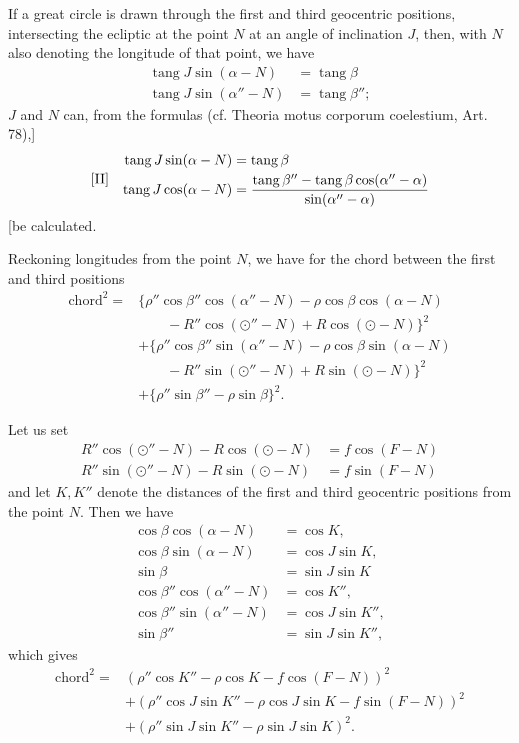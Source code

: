 If a great circle is drawn through the first and third geocentric positions, intersecting the ecliptic at the point \(N\) at an angle of inclination \(J\), then, with \(N\) also denoting the longitude of that point, we have
\[
\begin{aligned}
\operatorname{tang}J\sin(\alpha-N)&=\operatorname{tang}\beta\\
\operatorname{tang}J\sin(\alpha''-N)&=\operatorname{tang}\beta'';
\end{aligned}
\]
\(J\) and \(N\) can, from the formulas (cf. Theoria motus corporum coelestium, Art. 78),]
\[
\begin{array}{l@{\quad}l}
[\mathrm{II}]&\begin{aligned}
\operatorname{tang}J\sin(\alpha-N)&=\operatorname{tang}\beta\\
\operatorname{tang}J\cos(\alpha-N)&=\frac{\operatorname{tang}\beta''-\operatorname{tang}\beta\cos(\alpha''-\alpha)}{\sin(\alpha''-\alpha)}
\end{aligned}
\end{array}
\]
[be calculated.

Reckoning longitudes from the point \(N\), we have for the chord between the first and third positions
\[
\begin{aligned}
\text{chord}^2={}&\bigl\{\rho''\cos\beta''\cos(\alpha''-N)-\rho\cos\beta\cos(\alpha-N)\\
&\qquad{}-R''\cos(\odot''-N)+R\cos(\odot-N)\bigr\}^2\\
&+\bigl\{\rho''\cos\beta''\sin(\alpha''-N)-\rho\cos\beta\sin(\alpha-N)\\
&\qquad{}-R''\sin(\odot''-N)+R\sin(\odot-N)\bigr\}^2\\
&+\{\rho''\sin\beta''-\rho\sin\beta\}^2.
\end{aligned}
\]

Let us set
\[
\begin{aligned}
R''\cos(\odot''-N)-R\cos(\odot-N)&=f\cos(F-N)\\
R''\sin(\odot''-N)-R\sin(\odot-N)&=f\sin(F-N)
\end{aligned}
\]
and let \(K,K''\) denote the distances of the first and third geocentric positions from the point \(N\). Then we have
\[
\begin{aligned}
\cos\beta\cos(\alpha-N)&=\cos K,\\
\cos\beta\sin(\alpha-N)&=\cos J\sin K,\\
\sin\beta&=\sin J\sin K\\
\cos\beta''\cos(\alpha''-N)&=\cos K'',\\
\cos\beta''\sin(\alpha''-N)&=\cos J\sin K'',\\
\sin\beta''&=\sin J\sin K'',
\end{aligned}
\]
which gives
\[
\begin{aligned}
\text{chord}^2={}&(\rho''\cos K''-\rho\cos K-f\cos(F-N))^2\\
&+(\rho''\cos J\sin K''-\rho\cos J\sin K-f\sin(F-N))^2\\
&+(\rho''\sin J\sin K''-\rho\sin J\sin K)^2.
\end{aligned}
\]

